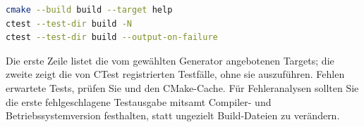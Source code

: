 \begin{lstlisting}[language=bash,caption={Build- und Testumfang nachvollziehen}]
cmake --build build --target help
ctest --test-dir build -N
ctest --test-dir build --output-on-failure
\end{lstlisting}
Die erste Zeile listet die vom gewählten Generator angebotenen
Targets; die zweite zeigt die von CTest registrierten Testfälle,
ohne sie auszuführen. Fehlen erwartete Tests, prüfen Sie
 und den CMake-Cache. Für
Fehleranalysen sollten Sie die erste fehlgeschlagene
Testausgabe mitsamt Compiler- und Betriebssystemversion
festhalten, statt ungezielt Build-Dateien zu verändern.


